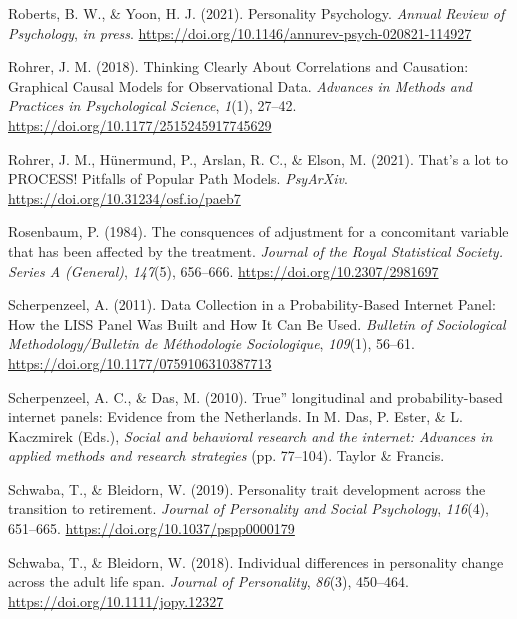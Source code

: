 \documentclass[
  english,
  man, noextraspace]{apa7}
\begin{document}
\leavevmode\hypertarget{ref-robertsPersonalityPsychology2021}{}%
Roberts, B. W., \& Yoon, H. J. (2021). Personality Psychology. \emph{Annual Review of Psychology}, \emph{in press}. \url{https://doi.org/10.1146/annurev-psych-020821-114927}

\leavevmode\hypertarget{ref-rohrerThinkingClearlyCorrelations2018}{}%
Rohrer, J. M. (2018). Thinking Clearly About Correlations and Causation: Graphical Causal Models for Observational Data. \emph{Advances in Methods and Practices in Psychological Science}, \emph{1}(1), 27--42. \url{https://doi.org/10.1177/2515245917745629}

\leavevmode\hypertarget{ref-rohrerThatLotPROCESS2021}{}%
Rohrer, J. M., Hünermund, P., Arslan, R. C., \& Elson, M. (2021). That's a lot to PROCESS! Pitfalls of Popular Path Models. \emph{PsyArXiv}. \url{https://doi.org/10.31234/osf.io/paeb7}

\leavevmode\hypertarget{ref-rosenbaumConsquencesAdjustmentConcomitant1984}{}%
Rosenbaum, P. (1984). The consquences of adjustment for a concomitant variable that has been affected by the treatment. \emph{Journal of the Royal Statistical Society. Series A (General)}, \emph{147}(5), 656--666. \url{https://doi.org/10.2307/2981697}

\leavevmode\hypertarget{ref-scherpenzeelDataCollectionProbabilityBased2011}{}%
Scherpenzeel, A. (2011). Data Collection in a Probability-Based Internet Panel: How the LISS Panel Was Built and How It Can Be Used. \emph{Bulletin of Sociological Methodology/Bulletin de Méthodologie Sociologique}, \emph{109}(1), 56--61. \url{https://doi.org/10.1177/0759106310387713}

\leavevmode\hypertarget{ref-scherpenzeelTrueLongitudinalProbabilitybased2010}{}%
Scherpenzeel, A. C., \& Das, M. (2010). True'' longitudinal and probability-based internet panels: Evidence from the Netherlands. In M. Das, P. Ester, \& L. Kaczmirek (Eds.), \emph{Social and behavioral research and the internet: Advances in applied methods and research strategies} (pp. 77--104). Taylor \& Francis.

\leavevmode\hypertarget{ref-schwabaPersonalityTraitDevelopment2019}{}%
Schwaba, T., \& Bleidorn, W. (2019). Personality trait development across the transition to retirement. \emph{Journal of Personality and Social Psychology}, \emph{116}(4), 651--665. \url{https://doi.org/10.1037/pspp0000179}

\leavevmode\hypertarget{ref-schwabaIndividualDifferencesPersonality2018}{}%
Schwaba, T., \& Bleidorn, W. (2018). Individual differences in personality change across the adult life span. \emph{Journal of Personality}, \emph{86}(3), 450--464. \url{https://doi.org/10.1111/jopy.12327}
\end{document}
